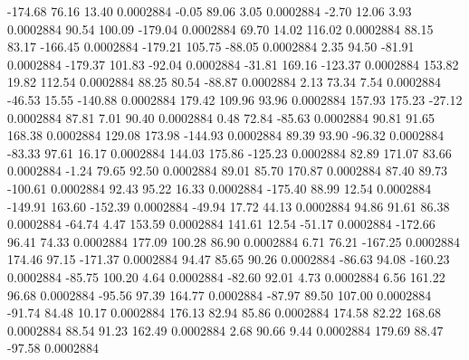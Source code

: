      -174.68       76.16       13.40     0.0002884
       -0.05       89.06        3.05     0.0002884
       -2.70       12.06        3.93     0.0002884
       90.54      100.09     -179.04     0.0002884
       69.70       14.02      116.02     0.0002884
       88.15       83.17     -166.45     0.0002884
     -179.21      105.75      -88.05     0.0002884
        2.35       94.50      -81.91     0.0002884
     -179.37      101.83      -92.04     0.0002884
      -31.81      169.16     -123.37     0.0002884
      153.82       19.82      112.54     0.0002884
       88.25       80.54      -88.87     0.0002884
        2.13       73.34        7.54     0.0002884
      -46.53       15.55     -140.88     0.0002884
      179.42      109.96       93.96     0.0002884
      157.93      175.23      -27.12     0.0002884
       87.81        7.01       90.40     0.0002884
        0.48       72.84      -85.63     0.0002884
       90.81       91.65      168.38     0.0002884
      129.08      173.98     -144.93     0.0002884
       89.39       93.90      -96.32     0.0002884
      -83.33       97.61       16.17     0.0002884
      144.03      175.86     -125.23     0.0002884
       82.89      171.07       83.66     0.0002884
       -1.24       79.65       92.50     0.0002884
       89.01       85.70      170.87     0.0002884
       87.40       89.73     -100.61     0.0002884
       92.43       95.22       16.33     0.0002884
     -175.40       88.99       12.54     0.0002884
     -149.91      163.60     -152.39     0.0002884
      -49.94       17.72       44.13     0.0002884
       94.86       91.61       86.38     0.0002884
      -64.74        4.47      153.59     0.0002884
      141.61       12.54      -51.17     0.0002884
     -172.66       96.41       74.33     0.0002884
      177.09      100.28       86.90     0.0002884
        6.71       76.21     -167.25     0.0002884
      174.46       97.15     -171.37     0.0002884
       94.47       85.65       90.26     0.0002884
      -86.63       94.08     -160.23     0.0002884
      -85.75      100.20        4.64     0.0002884
      -82.60       92.01        4.73     0.0002884
        6.56      161.22       96.68     0.0002884
      -95.56       97.39      164.77     0.0002884
      -87.97       89.50      107.00     0.0002884
      -91.74       84.48       10.17     0.0002884
      176.13       82.94       85.86     0.0002884
      174.58       82.22      168.68     0.0002884
       88.54       91.23      162.49     0.0002884
        2.68       90.66        9.44     0.0002884
      179.69       88.47      -97.58     0.0002884
